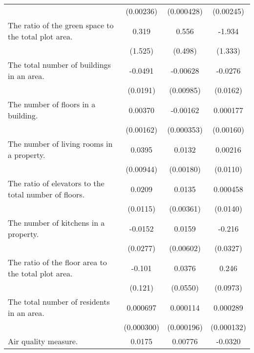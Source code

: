 {\begin{tabular}{l*{3}{c}}
                    &   (0.00236)         &  (0.000428)         &   (0.00245)         \\
\addlinespace
The ratio of the green space to the total plot area.&       0.319         &       0.556         &      -1.934         \\
                    &     (1.525)         &     (0.498)         &     (1.333)         \\
\addlinespace
The total number of buildings in an area.&     -0.0491\sym{**} &    -0.00628         &     -0.0276\sym{*}  \\
                    &    (0.0191)         &   (0.00985)         &    (0.0162)         \\
\addlinespace
The number of floors in a building.&     0.00370\sym{**} &    -0.00162\sym{***}&    0.000177         \\
                    &   (0.00162)         &  (0.000353)         &   (0.00160)         \\
\addlinespace
The number of living rooms in a property.&      0.0395\sym{***}&      0.0132\sym{***}&     0.00216         \\
                    &   (0.00944)         &   (0.00180)         &    (0.0110)         \\
\addlinespace
The ratio of elevators to the total number of floors.&      0.0209\sym{*}  &      0.0135\sym{***}&    0.000458         \\
                    &    (0.0115)         &   (0.00361)         &    (0.0140)         \\
\addlinespace
The number of kitchens in a property.&     -0.0152         &      0.0159\sym{***}&      -0.216\sym{***}\\
                    &    (0.0277)         &   (0.00602)         &    (0.0327)         \\
\addlinespace
The ratio of the floor area to the total plot area.&      -0.101         &      0.0376         &       0.246\sym{**} \\
                    &     (0.121)         &    (0.0550)         &    (0.0973)         \\
\addlinespace
The total number of residents in an area.&    0.000697\sym{**} &    0.000114         &    0.000289\sym{**} \\
                    &  (0.000300)         &  (0.000196)         &  (0.000132)         \\
\addlinespace
Air quality measure.&      0.0175\sym{***}&     0.00776\sym{***}&     -0.0320\sym{***}\\

\end{tabular}}
